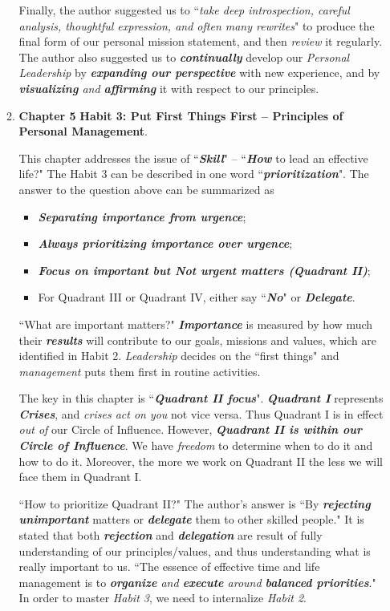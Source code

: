 \documentclass[11pt]{article}
\begin{document}
\begin{enumerate}
\begin{enumerate}
Finally, the author suggested us to ``\emph{take deep introspection, careful analysis, thoughtful expression, and often many rewrites}" to produce the final form of our personal mission statement, and then \emph{review} it regularly. The author also suggested us to \emph{\textbf{continually}} develop our \emph{Personal Leadership} by \emph{\textbf{expanding our perspective}} with new experience, and by \emph{\textbf{visualizing} and \textbf{affirming}} it with respect to our principles.


\item \textbf{Chapter 5} \textbf{Habit 3: Put First Things First -- Principles of Personal Management}. 

This chapter addresses the issue of ``\emph{\textbf{Skill}}" -- ``\emph{\textbf{How}} to lead an effective life?"  The Habit 3 can be described in one word ``\emph{\textbf{prioritization}}". The answer to the question above can be summarized as
\begin{itemize}
\item \emph{\textbf{Separating importance from urgence}};
\item \emph{\textbf{Always prioritizing importance over urgence}};
\item \emph{\textbf{Focus on important but Not urgent matters (Quadrant II)}};
\item For Quadrant III or Quadrant IV, either say ``\emph{\textbf{No}}" or \emph{\textbf{Delegate}}.
\end{itemize} ``What are important matters?" \emph{\textbf{Importance}} is measured by how much their \emph{\textbf{results}} will contribute to our goals, missions and values, which are identified in Habit 2. \emph{Leadership} decides on the ``first things" and \emph{management} puts them first in routine activities.

The key in this chapter is ``\emph{\textbf{Quadrant II focus}}". \emph{\textbf{Quadrant I}} represents \emph{\textbf{Crises}}, and \emph{crises act on you} not vice versa. Thus Quadrant I is in effect \emph{out of} our Circle of Influence. However, \emph{\textbf{Quadrant II is within our Circle of Influence}}. We have \emph{freedom} to determine when to do it and how to do it. Moreover, the more we work on Quadrant II the less we will face them in Quadrant I. 

``How to prioritize Quadrant II?" The author's answer is ``By \emph{\textbf{rejecting}} \emph{\textbf{unimportant}} matters or \emph{\textbf{delegate}} them to other skilled people." It is stated that both \emph{\textbf{rejection}} and \emph{\textbf{delegation}} are result of fully understanding of our principles/values, and thus understanding what is really important to us. ``The essence of effective time and life management is to \emph{\textbf{organize} and \textbf{execute} around \textbf{balanced priorities}}." In order to master \emph{Habit 3}, we need to internalize \emph{Habit 2}.


\end{enumerate}
\end{enumerate}
\end{document}
